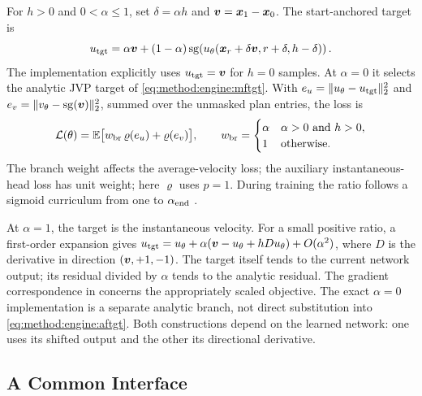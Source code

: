 For $h>0$ and $0<\alpha\le1$, set $\delta=\alpha h$ and
$\boldsymbol{v}=\boldsymbol{x}_{1}-\boldsymbol{x}_{0}$. The start-anchored target is
\begin{equation}\label{eq:method:engine:aftgt}
  u_{\textrm{tgt}}
  =\alpha\boldsymbol{v}+(1-\alpha)\operatorname{sg}\!\left(
    u_{\theta}(\boldsymbol{x}_{r}+\delta\boldsymbol{v},r+\delta,h-\delta)\right).
\end{equation}
The implementation explicitly uses $u_{\textrm{tgt}}=\boldsymbol{v}$ for $h=0$ samples. At
$\alpha=0$ it selects the analytic JVP target of \eqref{eq:method:engine:mftgt}.
With $e_u=\|u_{\theta}-u_{\textrm{tgt}}\|_2^2$ and
$e_v=\|v_{\theta}-\operatorname{sg}(\boldsymbol{v})\|_2^2$, summed over the unmasked plan entries, the loss is
\begin{equation}\label{eq:method:engine:afloss}
  \mathcal{L}(\theta)=\mathbb{E}\big[w_{\textrm{br}}\,\varrho(e_u)+\varrho(e_v)\big],
  \qquad
  w_{\textrm{br}}=\begin{cases}
    \alpha & \alpha>0\text{ and }h>0,\\
    1 & \text{otherwise}.
  \end{cases}
\end{equation}
The branch weight affects the average-velocity loss; the auxiliary instantaneous-head loss has
unit weight; here $\varrho$ uses $p=1$. During training the ratio follows a sigmoid curriculum from one to
$\alpha_{\textrm{end}}$ \parencite[Alg.~2]{zhang2025alphaflow}.

At $\alpha=1$, the target is the instantaneous velocity. For a small positive ratio, a first-order
expansion gives $u_{\textrm{tgt}}=u_{\theta}
+\alpha(\boldsymbol{v}-u_{\theta}+hDu_{\theta})+O(\alpha^2)$, where $D$ is the derivative
in direction $(\boldsymbol{v},+1,-1)$. The target itself tends to the current network output;
its residual divided by $\alpha$ tends to the analytic residual. The gradient correspondence in
\parencite[Thm.~1]{zhang2025alphaflow} concerns the appropriately scaled objective. The exact
$\alpha=0$ implementation is a separate analytic branch, not direct substitution into
\eqref{eq:method:engine:aftgt}. Both constructions depend on the learned network: one uses its
shifted output and the other its directional derivative.

\subsection{A Common Interface}\label{sec:method:interface}

